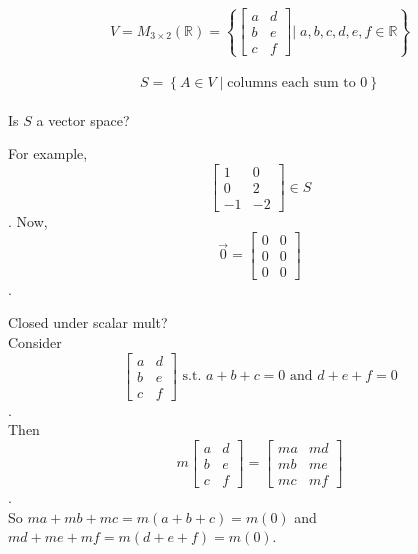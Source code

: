 \documentclass[../main.tex]{subfiles}
\begin{document}
\begin{example}
    \[ V = M_{3 \times 2}(\mathbb{R}) =\left\{ \begin{bmatrix} a & d \\ b & e \\ c & f \end{bmatrix} \Bigg\vert \; a,b,c,d,e,f \in \mathbb{R} \right\} \] \\
    \[ S = \left\{ A \in V \mid \text{columns each sum to 0} \right\} \] \\
    Is \( S \) a vector space?
    
    For example, \[ \begin{bmatrix} 1 & 0 \\ 0 & 2 \\ -1 & -2 \end{bmatrix} \in S \].
    Now, \[ \vec{0} = \begin{bmatrix} 0 & 0 \\ 0 & 0 \\ 0 & 0 \end{bmatrix} \].

    Closed under scalar mult? \checkmark \\
    Consider \[ \begin{bmatrix} a & d \\ b & e \\ c & f \end{bmatrix} \text{ s.t. } a+b+c = 0 \text{ and } d+e+f=0 \]. \\
    Then \[ m\begin{bmatrix} a & d \\ b & e \\ c & f \end{bmatrix} = \begin{bmatrix} ma & md \\ mb & me \\ mc & mf \end{bmatrix} \]. \\
    So \( ma+mb+mc = m(a+b+c) = m(0) \) and \( md+me+mf = m(d+e+f) = m(0) \). \checkmark


\end{example}
\end{document}
